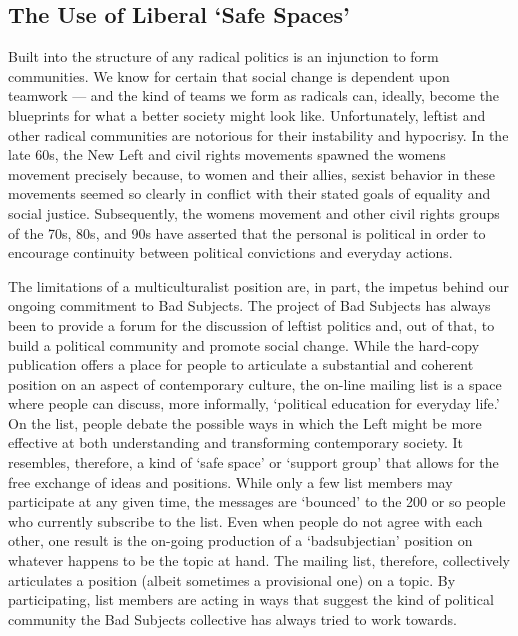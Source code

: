 \documentclass[letterpaper,12pt,english]{sphinxmanual}
\begin{document}
\subsection{The Use of Liberal `Safe Spaces'}
\label{1995:the-use-of-liberal-safe-spaces}
Built into the structure of any radical politics is an injunction to form communities. We know for certain that social change is dependent upon teamwork — and the kind of teams we form as radicals can, ideally, become the blueprints for what a better society might look like. Unfortunately, leftist and other radical communities are notorious for their instability and hypocrisy. In the late 60s, the New Left and civil rights movements spawned the womens movement precisely because, to women and their allies, sexist behavior in these movements seemed so clearly in conflict with their stated goals of equality and social justice. Subsequently, the womens movement and other civil rights groups of the 70s, 80s, and 90s have asserted that the personal is political in order to encourage continuity between political convictions and everyday actions.

The limitations of a multiculturalist position are, in part, the impetus behind our ongoing commitment to Bad Subjects. The project of Bad Subjects has always been to provide a forum for the discussion of leftist politics and, out of that, to build a political community and promote social change. While the hard-copy publication offers a place for people to articulate a substantial and coherent position on an aspect of contemporary culture, the on-line mailing list is a space where people can discuss, more informally, `political education for everyday life.' On the list, people debate the possible ways in which the Left might be more effective at both understanding and transforming contemporary society. It resembles, therefore, a kind of `safe space' or `support group' that allows for the free exchange of ideas and positions. While only a few list members may participate at any given time, the messages are `bounced' to the 200 or so people who currently subscribe to the list. Even when people do not agree with each other, one result is the on-going production of a `badsubjectian' position on whatever happens to be the topic at hand. The mailing list, therefore, collectively articulates a position (albeit sometimes a provisional one) on a topic. By participating, list members are acting in ways that suggest the kind of political community the Bad Subjects collective has always tried to work towards.
\end{document}
